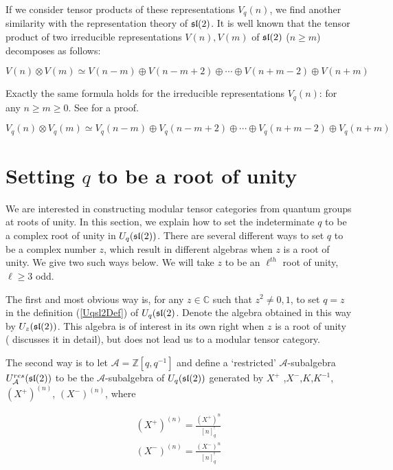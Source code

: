 If we consider tensor products of these representations $V_q(n)$, we find
another similarity with the representation theory of $\mathfrak{sl}(2)$. It is well
known that the tensor product of two irreducible representations $V(n), V(m)$
of $\mathfrak{sl}(2)$ ($n \geq m$) decomposes as follows:

\begin{equation}
V(n) \otimes V(m) \simeq V(n-m) \oplus V(n-m+2)  \oplus \cdots \oplus V(n+m-2)\oplus V(n+m)
\end{equation}

Exactly the same formula holds for the irreducible representations $V_q(n)$:
for any $n \geq m \geq 0$. See \cite{Kassel1994} for a proof.

\begin{equation}
V_q(n) \otimes V_q(m) \simeq V_q(n-m) \oplus V_q(n-m+2)  \oplus \cdots \oplus V_q(n+m-2)\oplus V_q(n+m)
\end{equation}

\section{Setting $q$ to be a root of unity}

We are interested in constructing modular tensor categories from quantum groups
at roots of unity. In this section, we explain how to set the indeterminate $q$
to be a complex root of unity in $U_q(\mathfrak{sl}(2))$. There are several different ways to
set $q$ to be a complex number $z$, which result in different algebras when $z$
is a root of unity. We give two such ways below. We will take $z$ to be an
$\ell^{th}$ root of unity, $\ell \geq 3$ odd.

The first and most obvious way is, for any $z \in \mathbb{C}$ such that $z ^2
\neq 0,1$, to set $q = z$ in the definition (\ref{Uqsl2Def}) of $U_q(\mathfrak{sl}(2)$.
Denote the algebra obtained in this way by $U_z(\mathfrak{sl}(2))$. This algebra is of
interest in its own right when $z$ is a root of unity (\cite{Jantzen1995}
discusses it in detail), but does not lead us to a modular tensor category.

The second way is to let $\mathcal{A} = \mathbb{Z}[q,q^{-1}]$ and define a
`restricted' $\mathcal{A}$-subalgebra $U_\mathcal{A}^{res}(\mathfrak{sl}(2))$ to be the
$\mathcal{A}$-subalgebra of $U_q(\mathfrak{sl}(2))$ generated by $ X^+$
,$X^-$,$K$,$K^{-1}$, $(X^+) ^{(n)}$, $(X^-)^{(n)}$, where


\begin{align}
     (X^+)^{(n)} = \frac{ (X^+)^n}{[n]^!_{q}} \\
    (X^-)^{(n)} = \frac{(X^-)^n}{[n]^!_{q}} 
\end{align}


